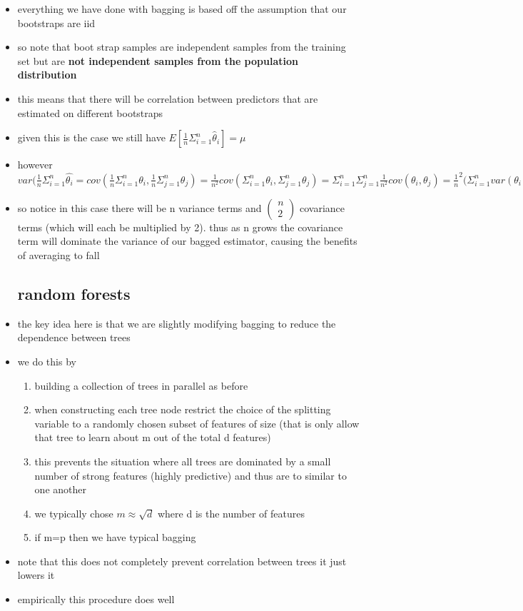 \documentclass{article}
\begin{document}
\begin{itemize}
\subsection*{motivating random forests: correlated prediction functions}
\item everything we have done with bagging is based off the assumption that our bootstraps are iid
\item so note that boot strap samples are independent samples from the training set but are \textbf{not independent samples from the population distribution}
\item this means that there will be correlation between predictors that are estimated on different bootstraps
\item given this is the case we still have $E[\frac{1}{n}\Sigma_{i=1}^{n}\hat{\theta}_i]=\mu$ 
\item however $var(\frac{1}{n}\Sigma_{i=1}^{n}\hat{\theta_i}=cov(\frac{1}{n}\Sigma_{i=1}^{n}\theta_i,\frac{1}{n}\Sigma_{j=1}^{n}\theta_j)=\frac{1}{n^2}cov(\Sigma_{i=1}^{n}\theta_i,\Sigma_{j=1}^{n}\theta_j)=\Sigma_{i=1}^{n}\Sigma_{j=1}^{n}\frac{1}{n^2}cov(\theta_i,\theta_j)=\frac{1}{n}^2(\Sigma_{i=1}^{n}var(\theta_i)+\Sigma_{j\geq i}cov(\theta_i, \theta_j)=\frac{\sigma^2}{n}+\frac{1}{n^2}\Sigma_{i=1}^{n}\Sigma_{j\geq i}cov(\theta_i, \theta_j)$
\item so notice in this case there will be n variance terms and $\begin{pmatrix}n\\2\end{pmatrix}$ covariance terms (which will each be multiplied by 2). thus as n grows the covariance term will dominate the variance  of our bagged estimator, causing the benefits of averaging to fall
\subsection*{random forests}
\item the key idea here is that we are slightly modifying bagging to reduce the dependence between trees 
\item we do this by 
\begin{enumerate}
    \item building a collection of trees in parallel as before
    \item when constructing each tree node restrict the choice of the splitting variable to a randomly chosen subset of features of size  (that is only allow that tree to learn about m out of the total d features)
    \item this prevents the situation where all trees are dominated by a small number of strong features (highly predictive) and thus are to similar to one another 
    \item we typically chose $m\approx \sqrt{d}$ where d is the number of features 
    \item if m=p then we have typical bagging 
\end{enumerate}
\item note that this does not completely prevent correlation between trees it just lowers it 
\item empirically this procedure does well

\end{itemize}
\end{document}
